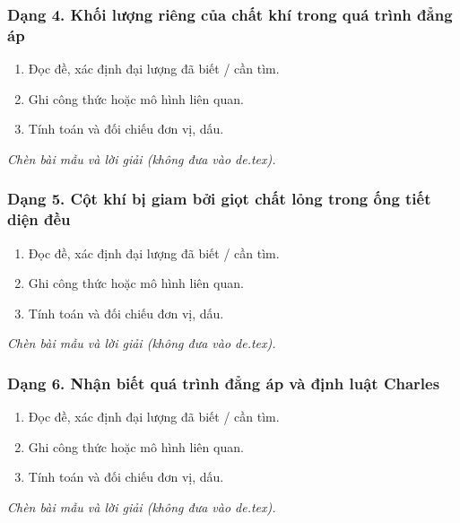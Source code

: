 \subsubsection{Dạng 4. Khối lượng riêng của chất khí trong quá trình đẳng áp}
\begin{phuongphap}
\begin{enumerate}
\item Đọc đề, xác định đại lượng đã biết / cần tìm.
\item Ghi công thức hoặc mô hình liên quan.
\item Tính toán và đối chiếu đơn vị, dấu.
\end{enumerate}
\end{phuongphap}
\begin{vidumau}
\textit{Chèn bài mẫu và lời giải (không đưa vào de.tex).}
\end{vidumau}

\subsubsection{Dạng 5. Cột khí bị giam bởi giọt chất lỏng trong ống tiết diện đều}
\begin{phuongphap}
\begin{enumerate}
\item Đọc đề, xác định đại lượng đã biết / cần tìm.
\item Ghi công thức hoặc mô hình liên quan.
\item Tính toán và đối chiếu đơn vị, dấu.
\end{enumerate}
\end{phuongphap}
\begin{vidumau}
\textit{Chèn bài mẫu và lời giải (không đưa vào de.tex).}
\end{vidumau}

\subsubsection{Dạng 6. Nhận biết quá trình đẳng áp và định luật Charles}
\begin{phuongphap}
\begin{enumerate}
\item Đọc đề, xác định đại lượng đã biết / cần tìm.
\item Ghi công thức hoặc mô hình liên quan.
\item Tính toán và đối chiếu đơn vị, dấu.
\end{enumerate}
\end{phuongphap}
\begin{vidumau}
\textit{Chèn bài mẫu và lời giải (không đưa vào de.tex).}
\end{vidumau}

